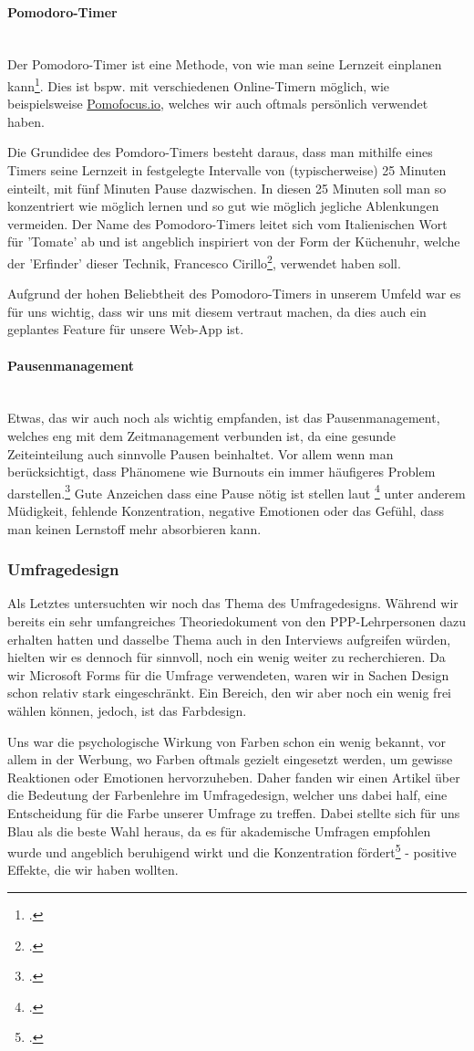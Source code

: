 \documentclass[12pt,a4paper]{report}
\newcommand{\myparagraph}[1]{\paragraph{#1}\mbox{}\\}
\begin{document}
\myparagraph{Pomodoro-Timer}
Der Pomodoro-Timer ist eine Methode, von wie man seine Lernzeit einplanen kann\footcite{Pomodoro}.
Dies ist bspw. mit verschiedenen Online-Timern möglich, wie beispielsweise \href{https://pomofocus.io/}{Pomofocus.io}, welches wir auch oftmals persönlich verwendet haben.

Die Grundidee des Pomdoro-Timers besteht daraus, dass man mithilfe eines Timers seine Lernzeit in festgelegte Intervalle von (typischerweise) 25 Minuten einteilt, mit fünf Minuten Pause dazwischen.
In diesen 25 Minuten soll man so konzentriert wie möglich lernen und so gut wie möglich jegliche Ablenkungen vermeiden. Der Name des Pomodoro-Timers leitet sich vom Italienischen Wort für 'Tomate' ab und ist angeblich inspiriert von der Form der Küchenuhr, welche der 'Erfinder' dieser Technik, Francesco Cirillo\footcite{Pomodoro}, verwendet haben soll.

Aufgrund der hohen Beliebtheit des Pomodoro-Timers in unserem Umfeld war es für uns wichtig, dass wir uns mit diesem vertraut machen, da dies auch ein geplantes Feature für unsere Web-App ist.

\myparagraph{Pausenmanagement}
Etwas, das wir auch noch als wichtig empfanden, ist das Pausenmanagement, welches eng mit dem Zeitmanagement verbunden ist, da eine gesunde Zeiteinteilung auch sinnvolle Pausen beinhaltet.
Vor allem wenn man berücksichtigt, dass Phänomene wie Burnouts ein immer häufigeres Problem darstellen.\footcite{Burnout}
Gute Anzeichen dass eine Pause nötig ist stellen laut \footcite{Pausenmanagement} unter anderem Müdigkeit, fehlende Konzentration, negative Emotionen oder das Gefühl, dass man keinen Lernstoff mehr absorbieren kann.

\subsubsection{Umfragedesign}
Als Letztes untersuchten wir noch das Thema des Umfragedesigns. 
Während wir bereits ein sehr umfangreiches Theoriedokument von den PPP-Lehrpersonen dazu erhalten hatten und dasselbe Thema auch in den Interviews aufgreifen würden, hielten wir es dennoch für sinnvoll, noch ein wenig weiter zu recherchieren.
Da wir Microsoft Forms für die Umfrage verwendeten, waren wir in Sachen Design schon relativ stark eingeschränkt. 
Ein Bereich, den wir aber noch ein wenig frei wählen können, jedoch, ist das Farbdesign.

Uns war die psychologische Wirkung von Farben schon ein wenig bekannt, vor allem in der Werbung, wo Farben oftmals gezielt eingesetzt werden, um gewisse Reaktionen oder Emotionen hervorzuheben.
Daher fanden wir einen Artikel über die Bedeutung der Farbenlehre im Umfragedesign, welcher uns dabei half, eine Entscheidung für die Farbe unserer Umfrage zu treffen.
Dabei stellte sich für uns Blau als die beste Wahl heraus, da es für akademische Umfragen empfohlen wurde und angeblich beruhigend wirkt und die Konzentration fördert\footcite{ColorPsychology} - positive Effekte, die wir haben wollten. 
\end{document}
